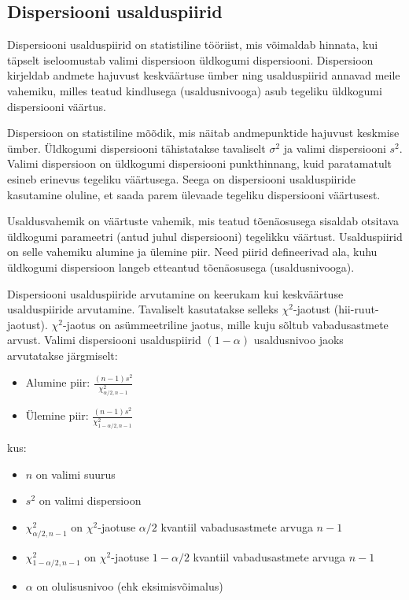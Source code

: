 \documentclass[
]{book}
\providecommand{\tightlist}{%
  \setlength{\itemsep}{0pt}\setlength{\parskip}{0pt}}
\begin{document}
\subsection{Dispersiooni usalduspiirid}\label{dispersiooni-usalduspiirid}

Dispersiooni usalduspiirid on statistiline tööriist, mis võimaldab hinnata, kui täpselt iseloomustab valimi dispersioon üldkogumi dispersiooni. Dispersioon kirjeldab andmete hajuvust keskväärtuse ümber ning usalduspiirid annavad meile vahemiku, milles teatud kindlusega (usaldusnivooga) asub tegeliku üldkogumi dispersiooni väärtus.

Dispersioon on statistiline mõõdik, mis näitab andmepunktide hajuvust keskmise ümber. Üldkogumi dispersiooni tähistatakse tavaliselt \(\sigma^2\) ja valimi dispersiooni \(s^2\). Valimi dispersioon on üldkogumi dispersiooni punkthinnang, kuid paratamatult esineb erinevus tegeliku väärtusega. Seega on dispersiooni usalduspiiride kasutamine oluline, et saada parem ülevaade tegeliku dispersiooni väärtusest.

Usaldusvahemik on väärtuste vahemik, mis teatud tõenäosusega sisaldab otsitava üldkogumi parameetri (antud juhul dispersiooni) tegelikku väärtust. Usalduspiirid on selle vahemiku alumine ja ülemine piir. Need piirid defineerivad ala, kuhu üldkogumi dispersioon langeb etteantud tõenäosusega (usaldusnivooga).

Dispersiooni usalduspiiride arvutamine on keerukam kui keskväärtuse usalduspiiride arvutamine. Tavaliselt kasutatakse selleks \(\chi^2\)-jaotust (hii-ruut-jaotust). \(\chi^2\)-jaotus on asümmeetriline jaotus, mille kuju sõltub vabadusastmete arvust. Valimi dispersiooni usalduspiirid \((1-\alpha)\) usaldusnivoo jaoks arvutatakse järgmiselt:

\begin{itemize}
\tightlist
\item
  Alumine piir: \(\frac{(n-1)s^2}{\chi^2_{\alpha/2, n-1}}\)
\item
  Ülemine piir: \(\frac{(n-1)s^2}{\chi^2_{1-\alpha/2, n-1}}\)
\end{itemize}

kus:

\begin{itemize}
\tightlist
\item
  \(n\) on valimi suurus
\item
  \(s^2\) on valimi dispersioon
\item
  \(\chi^2_{\alpha/2, n-1}\) on \(\chi^2\)-jaotuse \(\alpha/2\) kvantiil vabadusastmete arvuga \(n-1\)
\item
  \(\chi^2_{1-\alpha/2, n-1}\) on \(\chi^2\)-jaotuse \(1-\alpha/2\) kvantiil vabadusastmete arvuga \(n-1\)
\item
  \(\alpha\) on olulisusnivoo (ehk eksimisvõimalus)
\end{itemize}
\end{document}
